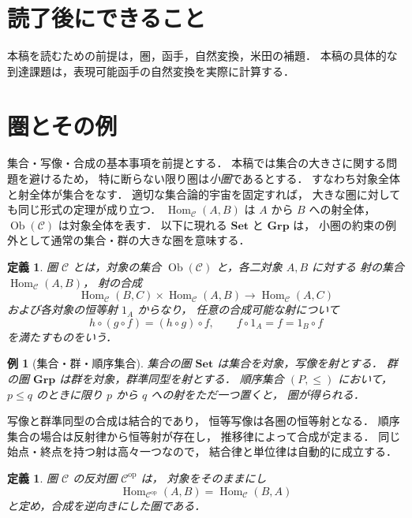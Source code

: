 \documentclass[a5paper,10pt,onecolumn]{jsarticle}
\makeatletter
\theoremstyle{mathnotetheorem}
\newtheorem{definition}[theorem]{定義}
\newtheorem{example}[theorem]{例}
\renewcommand{\proofname}{証明}
\renewenvironment{proof}[1][\proofname]{%
  \par\pushQED{\qed}\normalfont\topsep4\p@\@plus2\p@\relax
  \trivlist\item[\hskip\labelsep\bfseries #1]\ignorespaces
}{\popQED\endtrivlist\@endpefalse}
\makeatother
\begin{document}
\section*{読了後にできること}
本稿を読むための前提は，圏，函手，自然変換，米田の補題．
本稿の具体的な到達課題は，表現可能函手の自然変換を実際に計算する．

\section{圏とその例}

集合・写像・合成の基本事項を前提とする．
本稿では集合の大きさに関する問題を避けるため，
特に断らない限り圏は\emph{小圏}であるとする．
すなわち対象全体と射全体が集合をなす．
適切な集合論的宇宙を固定すれば，
大きな圏に対しても同じ形式の定理が成り立つ．
$\operatorname{Hom}_{\mathcal C}(A,B)$ は $A$ から $B$ への射全体，
$\operatorname{Ob}(\mathcal C)$ は対象全体を表す．
以下に現れる $\mathbf{Set}$ と $\mathbf{Grp}$ は，
小圏の約束の例外として通常の集合・群の大きな圏を意味する．

\begin{definition}
\emph{圏} $\mathcal C$ とは，対象の集合
$\operatorname{Ob}(\mathcal C)$ と，各二対象 $A,B$ に対する
射の集合 $\operatorname{Hom}_{\mathcal C}(A,B)$，
射の合成
\[
 \operatorname{Hom}_{\mathcal C}(B,C)
 \times\operatorname{Hom}_{\mathcal C}(A,B)
 \longrightarrow\operatorname{Hom}_{\mathcal C}(A,C)
\]
および各対象の恒等射 $1_A$ からなり，
任意の合成可能な射について
\[
 h\circ(g\circ f)=(h\circ g)\circ f,\qquad
 f\circ1_A=f=1_B\circ f
\]
を満たすものをいう．
\end{definition}

\begin{example}[集合・群・順序集合]
集合の圏 $\mathbf{Set}$ は集合を対象，写像を射とする．
群の圏 $\mathbf{Grp}$ は群を対象，群準同型を射とする．
順序集合 $(P,\le)$ において，
$p\le q$ のときに限り $p$ から $q$ への射をただ一つ置くと，
圏が得られる．
\end{example}
\begin{proof}
写像と群準同型の合成は結合的であり，
恒等写像は各圏の恒等射となる．
順序集合の場合は反射律から恒等射が存在し，
推移律によって合成が定まる．
同じ始点・終点を持つ射は高々一つなので，
結合律と単位律は自動的に成立する．
\end{proof}

\begin{definition}
圏 $\mathcal C$ の\emph{反対圏} $\mathcal C^{\mathrm{op}}$ は，
対象をそのままにし
\[
 \operatorname{Hom}_{\mathcal C^{\mathrm{op}}}(A,B)
 =\operatorname{Hom}_{\mathcal C}(B,A)
\]
と定め，合成を逆向きにした圏である．
\end{definition}
\end{document}
